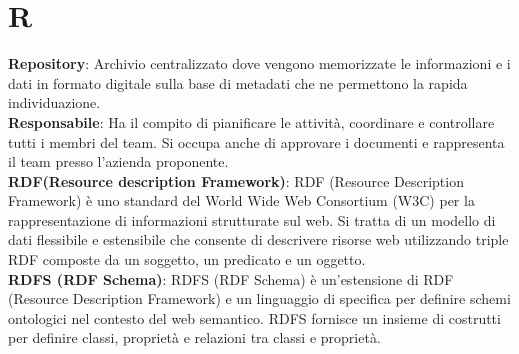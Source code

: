 \section{R}
\textbf{Repository}: Archivio centralizzato dove vengono memorizzate le informazioni e i dati in formato digitale sulla base di metadati che ne permettono la rapida individuazione.\\
\textbf{Responsabile}: Ha il compito di pianificare le attività, coordinare e controllare tutti i membri del team.
Si occupa anche di approvare i documenti e rappresenta il team presso l'azienda proponente.\\
\textbf{RDF(Resource description Framework)}: RDF (Resource Description Framework) è uno standard del World Wide Web Consortium (W3C) per la rappresentazione di informazioni strutturate sul web. Si tratta di un modello di dati flessibile e estensibile che consente di descrivere risorse web utilizzando triple RDF composte da un soggetto, un predicato e un oggetto.\\
\textbf{RDFS (RDF Schema)}: RDFS (RDF Schema) è un'estensione di RDF (Resource Description Framework) e un linguaggio di specifica per definire schemi ontologici nel contesto del web semantico. RDFS fornisce un insieme di costrutti per definire classi, proprietà e relazioni tra classi e proprietà.